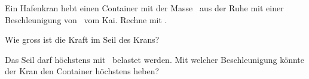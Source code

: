 Ein Hafenkran hebt einen Container mit der Masse \mCO\ aus der Ruhe mit einer Beschleunigung von \aO\ vom Kai. Rechne mit \gO.

\begin{abcliste}
\abc
Wie gross ist die Kraft im Seil des Krans?

\abc
Das Seil darf höchstens mit \FmaxO\ belastet werden. Mit welcher Beschleunigung könnte der Kran den Container höchstens heben?
\end{abcliste}
